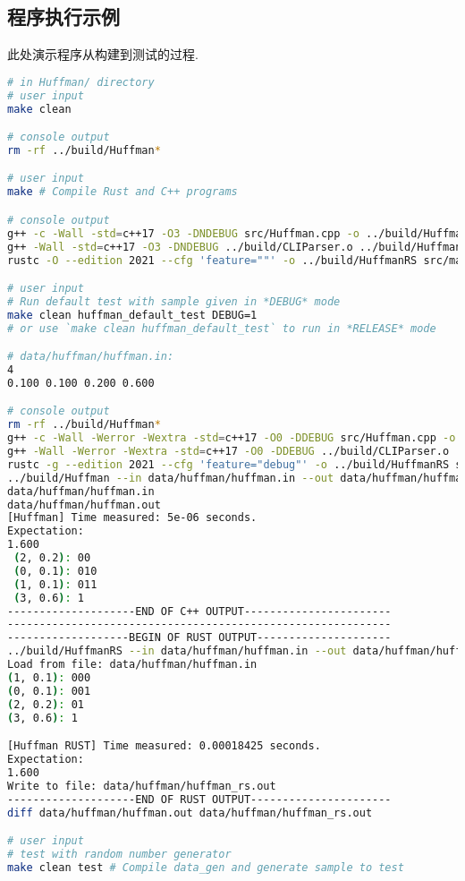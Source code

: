\subsection{程序执行示例}
\label{sec:dpBench}
此处演示程序从构建到测试的过程.
\begin{lstlisting}[language=bash]
# in Huffman/ directory
# user input
make clean

# console output
rm -rf ../build/Huffman*

# user input
make # Compile Rust and C++ programs

# console output
g++ -c -Wall -std=c++17 -O3 -DNDEBUG src/Huffman.cpp -o ../build/Huffman.o
g++ -Wall -std=c++17 -O3 -DNDEBUG ../build/CLIParser.o ../build/Huffman.o -o ../build/Huffman
rustc -O --edition 2021 --cfg 'feature=""' -o ../build/HuffmanRS src/main.rs

# user input
# Run default test with sample given in *DEBUG* mode
make clean huffman_default_test DEBUG=1
# or use `make clean huffman_default_test` to run in *RELEASE* mode

# data/huffman/huffman.in:
4
0.100 0.100 0.200 0.600

# console output
rm -rf ../build/Huffman*
g++ -c -Wall -Werror -Wextra -std=c++17 -O0 -DDEBUG src/Huffman.cpp -o ../build/Huffman.o
g++ -Wall -Werror -Wextra -std=c++17 -O0 -DDEBUG ../build/CLIParser.o ../build/Huffman.o -o ../build/Huffman
rustc -g --edition 2021 --cfg 'feature="debug"' -o ../build/HuffmanRS src/main.rs
../build/Huffman --in data/huffman/huffman.in --out data/huffman/huffman.out
data/huffman/huffman.in
data/huffman/huffman.out
[Huffman] Time measured: 5e-06 seconds.
Expectation:
1.600
 (2, 0.2): 00
 (0, 0.1): 010
 (1, 0.1): 011
 (3, 0.6): 1
--------------------END OF C++ OUTPUT-----------------------
------------------------------------------------------------
-------------------BEGIN OF RUST OUTPUT---------------------
../build/HuffmanRS --in data/huffman/huffman.in --out data/huffman/huffman_rs.out
Load from file: data/huffman/huffman.in
(1, 0.1): 000
(0, 0.1): 001
(2, 0.2): 01
(3, 0.6): 1

[Huffman RUST] Time measured: 0.00018425 seconds.
Expectation:
1.600
Write to file: data/huffman/huffman_rs.out
--------------------END OF RUST OUTPUT----------------------
diff data/huffman/huffman.out data/huffman/huffman_rs.out

# user input
# test with random number generator
make clean test # Compile data_gen and generate sample to test


\end{lstlisting}
